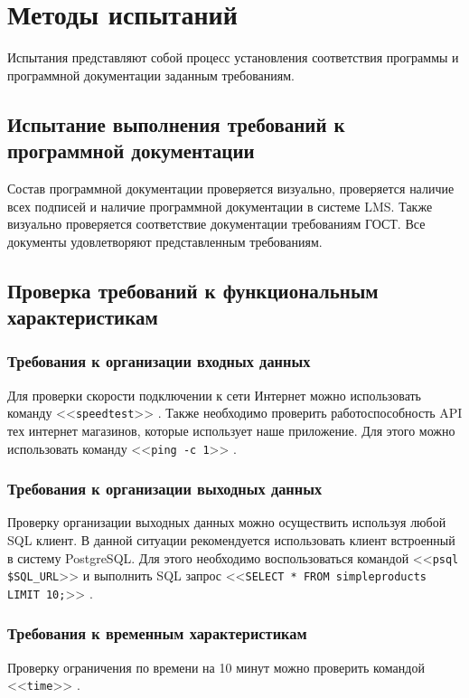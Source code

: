 \documentclass[a4paper,12pt]{article}
\begin{document}
  \newpage
  \section{Методы испытаний}
  Испытания представляют собой процесс установления соответствия программы и программной документации заданным требованиям.

  \subsection{Испытание выполнения требований к программной документации}
  Состав программной документации проверяется визуально,
  проверяется наличие всех подписей и наличие программной документации в системе LMS.
  Также визуально проверяется соответствие документации требованиям ГОСТ. Все документы удовлетворяют представленным требованиям.

  \subsection{Проверка требований к функциональным характеристикам}

  \subsubsection{Требования к организации входных данных}
  Для проверки скорости подключении к сети Интернет можно использовать команду <<\texttt{speedtest}>>
  .
  Также необходимо проверить работоспособность API тех интернет магазинов, которые использует наше приложение.
  Для этого можно использовать команду <<\texttt{ping -c 1}>>
  .

  \subsubsection{Требования к организации выходных данных}
  Проверку организации выходных данных можно осуществить используя любой SQL клиент.
  В данной ситуации рекомендуется использовать клиент встроенный в систему PostgreSQL.
  Для этого необходимо воспользоваться командой <<\texttt{psql \$SQL\_URL}>>
  и выполнить SQL запрос <<\texttt{SELECT * FROM simpleproducts LIMIT 10;}>>
  .

  \subsubsection{Требования к временным характеристикам}
  Проверку ограничения по времени на 10 минут можно проверить командой <<\texttt{time}>>
  .
\end{document}
